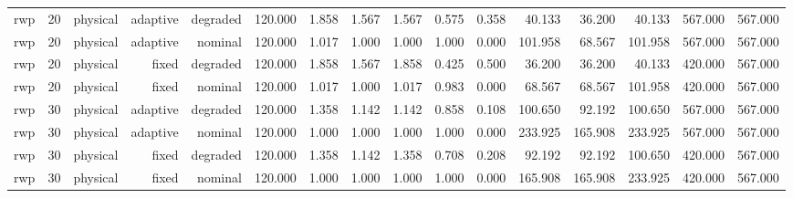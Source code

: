 \begin{tabular}{lrrrrrrrrrrrrrrr}
rwp & 20 & physical & adaptive & degraded & 120.000 & 1.858 & 1.567 & 1.567 & 0.575 & 0.358 & 40.133 & 36.200 & 40.133 & 567.000 & 567.000 \\
rwp & 20 & physical & adaptive & nominal & 120.000 & 1.017 & 1.000 & 1.000 & 1.000 & 0.000 & 101.958 & 68.567 & 101.958 & 567.000 & 567.000 \\
rwp & 20 & physical & fixed & degraded & 120.000 & 1.858 & 1.567 & 1.858 & 0.425 & 0.500 & 36.200 & 36.200 & 40.133 & 420.000 & 567.000 \\
rwp & 20 & physical & fixed & nominal & 120.000 & 1.017 & 1.000 & 1.017 & 0.983 & 0.000 & 68.567 & 68.567 & 101.958 & 420.000 & 567.000 \\
rwp & 30 & physical & adaptive & degraded & 120.000 & 1.358 & 1.142 & 1.142 & 0.858 & 0.108 & 100.650 & 92.192 & 100.650 & 567.000 & 567.000 \\
rwp & 30 & physical & adaptive & nominal & 120.000 & 1.000 & 1.000 & 1.000 & 1.000 & 0.000 & 233.925 & 165.908 & 233.925 & 567.000 & 567.000 \\
rwp & 30 & physical & fixed & degraded & 120.000 & 1.358 & 1.142 & 1.358 & 0.708 & 0.208 & 92.192 & 92.192 & 100.650 & 420.000 & 567.000 \\
rwp & 30 & physical & fixed & nominal & 120.000 & 1.000 & 1.000 & 1.000 & 1.000 & 0.000 & 165.908 & 165.908 & 233.925 & 420.000 & 567.000 \\
\bottomrule
\end{tabular}